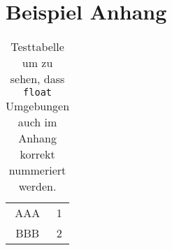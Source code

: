 \section{Beispiel Anhang}
\label{apx:sec:exampleAppendix}

\lipsum[1-5]

\begin{table}
    \centering
    \begin{tabular}{|c|c|}
        \hline
        AAA & 1 \\
        BBB & 2 \\
        \hline
    \end{tabular}
\caption[Testtabelle]{Testtabelle um zu sehen, dass \texttt{float} Umgebungen auch im Anhang korrekt nummeriert werden.}
\end{table}
